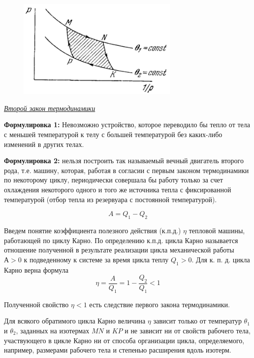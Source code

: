 \begin{figure}[H]
\includegraphics[width=0.7\textwidth]{10/carno.png}
\end{figure}


\begin{center}
	\textit{\underline{Второй закон термодинамики}}
\end{center}

\textbf{Формулировка 1:} Невозможно устройство, которое переводило бы тепло от тела с меньшей температурой к телу с большей температурой без каких-либо изменений в других телах.

\textbf{Формулировка 2:} нельзя построить так называемый вечный двигатель второго рода, т.е. машину,  которая,  работая в согласии с первым законом термодинамики по некоторому циклу,  периодически совершала бы работу только за счет охлаждения некоторого одного и того же источника тепла с фиксированной температурой (отбор тепла из резервуара с постоянной температурой).

$$ A = Q_1 - Q_2 $$

Введем понятие коэффициента полезного действия (к.п.д.) $\eta$ тепловой машины, работающей по циклу Карно. По определению к.п.д.  цикла Карно называется отношение полученной в результате реализации цикла механической работы $А > 0$ к подведенному к системе за время цикла теплу $Q_1 > 0$.  Для к. п. д. цикла Карно верна формула
$$ \eta = \frac{A}{Q_1} = 1 - \frac{Q_2}{Q_1} < 1 $$

Полученной свойство $\eta < 1$ есть следствие первого закона термодинамики. 

\begin{state}
	Для всякого обратимого цикла Карно величина $\eta$ зависит только от температур $\theta_1$ и $\theta_2$,  заданных на изотермах $MN$ и $KP$ и не зависит ни от свойств рабочего тела, участвующего в цикле Карно ни от способа организации цикла, определяемого, например, размерами рабочего тела и степенью расширения вдоль изотерм.
\end{state}

